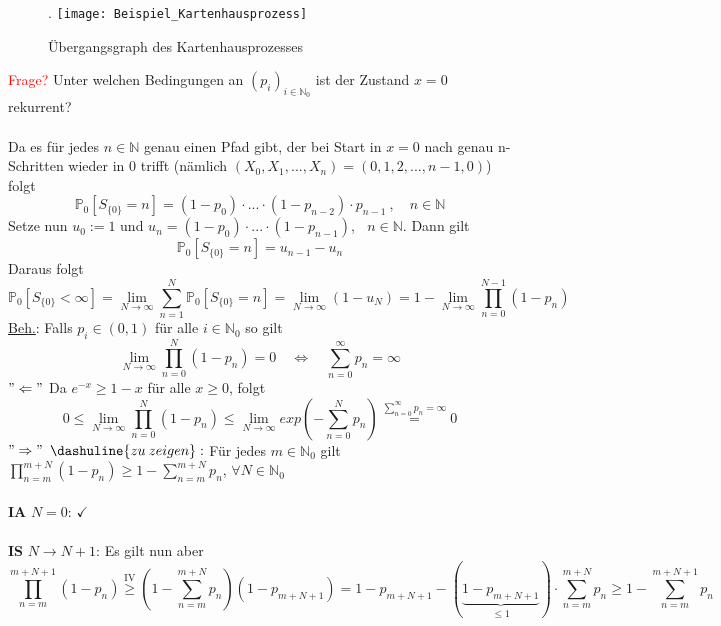\begin{figure}[H].
\centering
\texttt{[image: Beispiel\_Kartenhausprozess]}
\caption{Übergangsgraph des Kartenhausprozesses}
\end{figure}
\noindent
\textcolor{red}{Frage?} Unter welchen Bedingungen an $(p_{i})_{i \in \mathbb{N}_{0}}$ ist der Zustand $x=0$ rekurrent?
\\
\\
Da es für jedes $n \in \mathbb{N}$ genau einen Pfad gibt, der bei Start in $x=0$ nach genau n-Schritten wieder in 0 trifft (nämlich $(X_{0},X_{1},...,X_{n}) = (0,1,2,...,n-1,0)$) folgt
\begin{equation*}
\mathbb{P}_{0} [S_{\lbrace 0 \rbrace} = n] = (1-p_{0}) \cdot ... \cdot (1-p_{n-2}) \cdot p_{n-1} \: , \quad n \in \mathbb{N}
\end{equation*} 
Setze nun $u_{0} := 1$ und $u_{n} = (1-p_{0}) \cdot ... \cdot (1-p_{n-1})$, $\:$ $n \in \mathbb{N}$. Dann gilt
\begin{equation*}
\mathbb{P}_{0} [S_{\lbrace 0 \rbrace} = n] = u_{n-1} - u_{n}
\end{equation*}
Daraus folgt
\begin{equation*}
\mathbb{P}_{0} [S_{\lbrace 0 \rbrace} < \infty] = \lim_{N \to \infty} \sum_{n=1}^{N} \mathbb{P}_{0} [S_{\lbrace 0 \rbrace} = n] = \lim_{N \to \infty}(1-u_{N}) = 1 - \lim_{N \to \infty } \prod_{n=0}^{N-1}  (1 - p_{n})
\end{equation*}
\underline{Beh.}: Falls $p_{i} \in (0,1)$ für alle $i \in \mathbb{N}_{0}$ so gilt
\begin{equation*}
\lim_{N \to \infty} \prod_{n=0}^{N} (1-p_{n}) = 0 \quad \Leftrightarrow \quad \sum_{n=0}^{\infty} p_{n} = \infty
\end{equation*}
$"\Leftarrow"$ Da $e^{-x} \geq 1-x$ für alle $x \geq 0$, folgt
\begin{equation*}
0 \leq \lim_{N \to \infty} \prod_{n=0}^{N} (1-p_{n}) \leq \lim_{N \to \infty} exp(-\sum_{n=0}^{N}p_{n}) \stackrel{\sum_{n=0}^{\infty}p_{n} = \infty}{=} 0
\end{equation*}
$"\Rightarrow"$ $\dashuline{zu \: zeigen}:$ Für jedes $m \in \mathbb{N}_{0}$ gilt $\prod_{n=m}^{m+N}(1-p_{n}) \geq 1 - \sum_{n=m}^{m+N}p_{n}$, $\forall N \in \mathbb{N}_{0}$
\\
\\
\textbf{IA} $N=0$: $\checkmark$
\\
\\
\textbf{IS} $N \to N+1$: Es gilt nun aber
\begin{equation*}
\prod_{n=m}^{m+N+1} (1-p_{n}) \stackrel{\mathrm{IV}}{\geq} (1 - \sum_{n=m}^{m+N}p_{n})(1-p_{m+N+1}) = 1 - p_{m+N+1} - (\underbrace{1-p_{m+N+1}}_{\leq 1}) \cdot \sum_{n=m}^{m+N}p_{n} \geq 1 - \sum_{n=m}^{m+N+1} p_{n}
\end{equation*}
